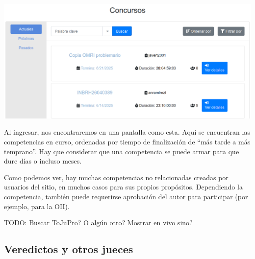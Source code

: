 \documentclass{beamer}
\begin{document}
    \begin{frame}[noframenumbering]
        \begin{center}
            \includegraphics[width=.8\linewidth]{./ou_contests.png}
        \end{center}\pause
        Al ingresar, nos encontraremos en una pantalla como esta. Aquí se encuentran las competencias en curso, ordenadas por tiempo de finalización de ``más tarde a más temprano''. Hay que considerar que una competencia se puede armar para que dure días o incluso meses. \pause

        Como podemos ver, hay muchas competencias no relacionadas creadas por usuarios del sitio, en muchos casos para sus propios propósitos. \pause Dependiendo la competencia, también puede requerirse aprobación del autor para participar (por ejemplo, para la OII).
    \end{frame}


    \begin{frame}[noframenumbering]
        TODO: Buscar ToJuPro? O algún otro? Mostrar en vivo sino?
    \end{frame}


    \subsection{Veredictos y otros jueces}
    \begin{frame}
    \end{frame}
\end{document}
